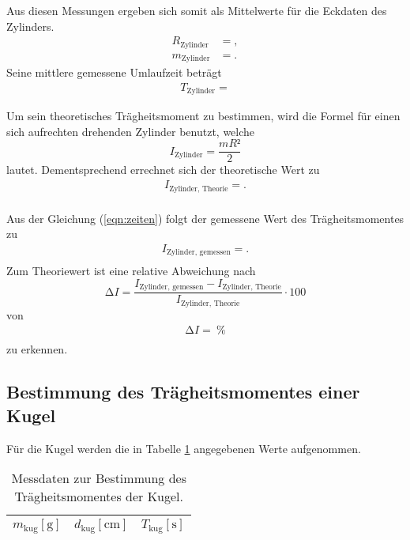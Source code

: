 Aus diesen Messungen ergeben sich somit als Mittelwerte für die Eckdaten des Zylinders.
\begin{align*}
  R_{\text{Zylinder}} &= , \\
  m_{\text{Zylinder}} &= .
\end{align*}
Seine mittlere gemessene Umlaufzeit beträgt
\begin{align*}
  T_{\text{Zylinder}} = 
\end{align*}

Um sein theoretisches Trägheitsmoment zu bestimmen, wird die Formel für einen sich aufrechten drehenden Zylinder benutzt, welche
\begin{equation}
  I_{\text{Zylinder}} = \frac{mR²}{2}
\end{equation}
lautet.
Dementsprechend errechnet sich der theoretische Wert zu
\begin{align*}
  I_{\text{Zylinder, Theorie}} = . \\
\end{align*}

Aus der Gleichung (\ref{eqn:zeiten}) folgt der gemessene Wert des Trägheitsmomentes zu
\begin{align*}
  I_{\text{Zylinder, gemessen}} = . \\
\end{align*}
Zum Theoriewert ist eine relative Abweichung nach
\begin{equation}
  \increment I = \frac{I_{\text{Zylinder, gemessen}} - I_{\text{Zylinder, Theorie}}}{I_{\text{Zylinder, Theorie}}} \cdot 100
\end{equation}
von
\begin{align*}
  \increment I =  \:\si{\percent} \\
\end{align*}
zu erkennen.


\subsection{Bestimmung des Trägheitsmomentes einer Kugel}
Für die Kugel werden die in Tabelle \ref{tab:kug} angegebenen Werte aufgenommen.

\begin{table}[H]
  \centering
  \caption{Messdaten zur Bestimmung des Trägheitsmomentes der Kugel.}
  \label{tab:kug}
  \begin{tabular}{c c c}
    \toprule
    {$m_\text{kug} [\si{\gram}]$} & {$d_\text{kug} [\si{\centi\metre}]$} & {$T_\text{kug} [\si{\second}]$}\\
    \midrule
    
    \bottomrule
  \end{tabular}
\end{table}

